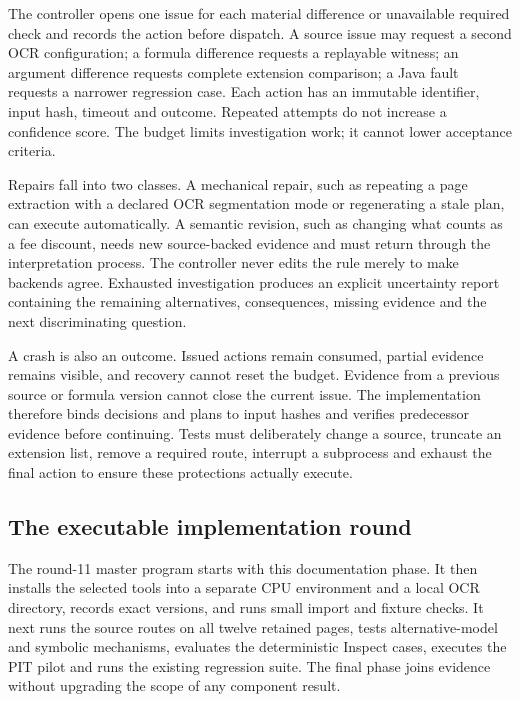 \documentclass[12pt,a4paper,oneside,openany]{book}
\begin{document}
The controller opens one issue for each material difference or unavailable
required check and records the action before dispatch. A source issue may request
a second OCR configuration; a formula difference requests a replayable witness;
an argument difference requests complete extension comparison; a Java fault
requests a narrower regression case. Each action has an immutable identifier,
input hash, timeout and outcome. Repeated attempts do not increase a confidence
score. The budget limits investigation work; it cannot lower acceptance criteria.

Repairs fall into two classes. A mechanical repair, such as repeating a page
extraction with a declared OCR segmentation mode or regenerating a stale plan,
can execute automatically. A semantic revision, such as changing what counts as
a fee discount, needs new source-backed evidence and must return through the
interpretation process. The controller never edits the rule merely to make
backends agree. Exhausted investigation produces an explicit uncertainty report
containing the remaining alternatives, consequences, missing evidence and the
next discriminating question.

A crash is also an outcome. Issued actions remain consumed, partial evidence
remains visible, and recovery cannot reset the budget. Evidence from a previous
source or formula version cannot close the current issue. The implementation
therefore binds decisions and plans to input hashes and verifies predecessor
evidence before continuing. Tests must deliberately change a source, truncate
an extension list, remove a required route, interrupt a subprocess and exhaust
the final action to ensure these protections actually execute.

\subsection{The executable implementation round}

The round-11 master program starts with this documentation phase. It then installs
the selected tools into a separate CPU environment and a local OCR directory,
records exact versions, and runs small import and fixture checks. It next runs
the source routes on all twelve retained pages, tests alternative-model and
symbolic mechanisms, evaluates the deterministic Inspect cases, executes the
PIT pilot and runs the existing regression suite. The final phase joins evidence
without upgrading the scope of any component result.
\end{document}
